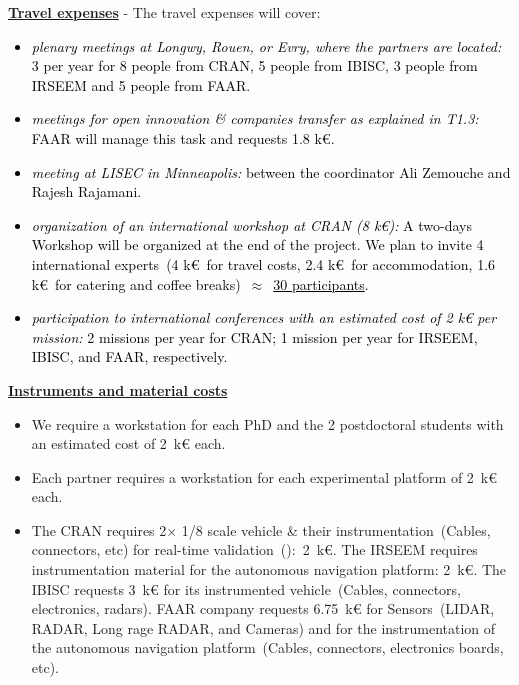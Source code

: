 \documentclass[a4paper,11pt]{article}
\begin{document}
%
\noindent
\underline{\textbf{\bf Travel expenses}} - The travel expenses will cover:
\textcolor{black}{
\begin{itemize}[leftmargin=.25in,noitemsep,nolistsep]
\item {\it plenary meetings at Longwy, Rouen, or Evry, where the partners are located:} 3 per year for 8 people from CRAN, 5 people from IBISC, 3 people from IRSEEM and 5 people from FAAR. 
\item {\it meetings for open innovation \& companies transfer as explained in T1.3:} FAAR will manage this task and requests 1.8 k\euro.
\item {\it meeting at LISEC in Minneapolis:} between the coordinator {Ali \sc Zemouche} and {Rajesh \sc Rajamani}.
\item {\it organization of an international workshop at CRAN (8 k\euro):} A two-days Workshop will be organized at the end of the project. We plan to invite 4 international experts~(4 k\euro~for travel costs, 2.4 k\euro~for accommodation, 1.6 k\euro~for catering and coffee breaks)~$\approx$~\underline{30 participants}.
\item {\it participation to international conferences with an estimated cost of 2 k{\euro} per mission:} 2 missions per year for CRAN; 1 mission per year for IRSEEM, IBISC, and FAAR, respectively.
\end{itemize}
}


\noindent
\underline{\textbf{Instruments and material costs}} 
\begin{itemize}[leftmargin=.25in,noitemsep,nolistsep]
\item We require a workstation for each PhD and the 2 postdoctoral students with an estimated cost of 2~k{\euro} each.
\item Each partner requires a workstation for each experimental platform of 2~k{\euro} each.
\item The CRAN requires {2$\times$ 1/8 scale vehicle \& their instrumentation~(Cables, connectors, etc) for real-time validation~(\underline{\bf \color{black}{WP5}})}:~2~k{\euro}. The IRSEEM requires instrumentation material for the autonomous navigation platform: 2~k{\euro}. The IBISC requests 3~k{\euro} for its instrumented vehicle~(Cables, connectors, electronics, radars). FAAR company requests 6.75~k{\euro} for Sensors~(LIDAR, RADAR, Long rage RADAR, and Cameras) and for the instrumentation of the autonomous navigation platform~(Cables, connectors, electronics boards, etc).
\end{itemize}
\end{document}

